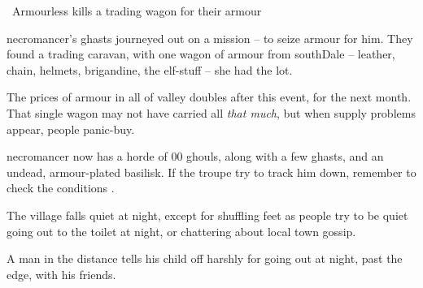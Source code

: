 \boxPair[t]{
  \thenecromancer
}{
  \showStdSpells
}

\newcommand\deadProgressChart{
  \begin{nametable}{Dead Tactics}

    \textbf{Round} & \textbf{Event} \\\hline

    1 & 200 ghouls assault the gate. \\

    2 & 4 ghasts each attack a quarter of the \gls{village} each (one attempts to open the gate). \\

    3 & \Gls{necromancer} casts offensive spells on anyone at the gate. \\

    4 & The ghouls have formed a pyramid at the gate. \\

    5 & 5 ghouls climb over the gate. \\

    6 & 10 more ghouls climb over the gate. \\

    7 & 15 more ghouls climb over the gate, and the \gls{village} falls. \\

  \end{nametable}
  \label{necroTactics}
}

{\squash~Armourless}%
{ kills a trading wagon for their armour}%
\label{necroArmour}

\begin{exampletext}
  \Gls{necromancer}'s ghasts journeyed out on a mission -- to seize armour for him.
  They found a trading caravan, with one wagon of armour from \gls{southDale} -- leather, chain, helmets, brigandine, the elf-stuff -- she had the lot.
\end{exampletext}

The prices of armour in all of \gls{valley} doubles after this event, for the next month.
That single wagon may not have carried all \emph{that much}, but when supply problems appear, people panic-buy.

\Gls{necromancer} now has a horde of 00 ghouls, along with a few ghasts, and an undead, armour-plated \gls{basilisk}.
If the troupe try to track him down, remember to check the conditions .

\begin{boxtext}
  The \gls{village} falls quiet at night, except for shuffling feet as people try to be quiet going out to the toilet at night, or chattering about local town gossip.

  A man in the distance tells his child off harshly for going out at night, past the \gls{edge}, with his friends.
\end{boxtext}

